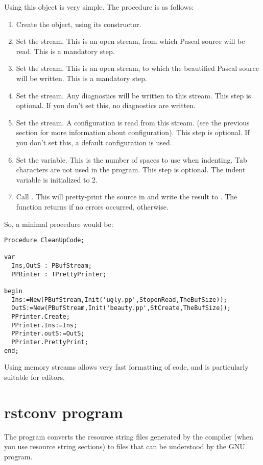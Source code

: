 Using this object is very simple. The procedure is as follows:
\begin{enumerate}
\item Create the object, using its constructor.
\item Set the  stream. This is an open stream, from which Pascal source will be
read. This is a mandatory step.
\item Set the  stream. This is an open stream, to which the
beautified Pascal source will be written. This is a mandatory step.
\item Set the  stream. Any diagnostics will be written to this
stream. This step is optional. If you don't set this, no diagnostics are
written.
\item Set the  stream. A configuration is read from this stream.
(see the previous section for more information about configuration). This
step is optional. If you don't set this, a default configuration is used.
\item Set the  variable. This is the number of spaces to use
when indenting. Tab characters are not used in the program. This step is
optional. The indent variable is initialized to 2.
\item Call . This will pretty-print the source in 
and write the result to . The function returns  if no
errors occurred,  otherwise.
\end{enumerate}

So, a minimal procedure would be:
\begin{verbatim}
Procedure CleanUpCode;

var
  Ins,OutS : PBufStream;
  PPRinter : TPrettyPrinter;

begin
  Ins:=New(PBufStream,Init('ugly.pp',StopenRead,TheBufSize));
  OutS:=New(PBufStream,Init('beauty.pp',StCreate,TheBufSize));
  PPrinter.Create;
  PPrinter.Ins:=Ins;
  PPrinter.outS:=OutS;
  PPrinter.PrettyPrint;
end;
\end{verbatim}

Using memory streams allows very fast formatting of code, and is
particularly suitable for editors.

\section{rstconv program}

The  program converts the resource string files generated by
the compiler (when you use resource string sections) to  files
that can be understood by the GNU  program.

